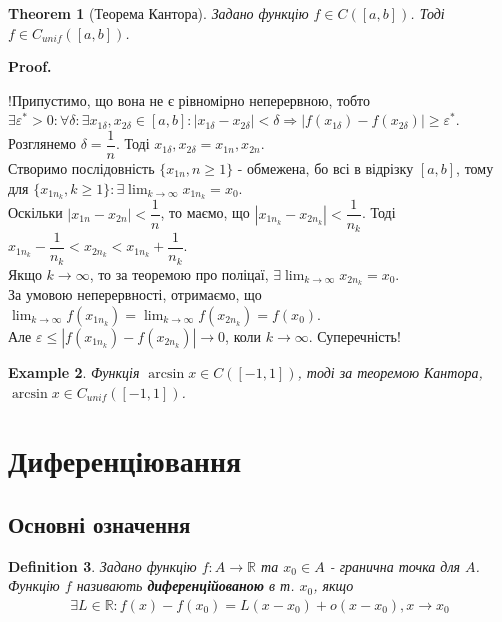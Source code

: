 \documentclass[a4paper, 14pt]{article}
\makeatletter
\def\qed{$\blacksquare$}
\theoremstyle{theoremdd}
\newtheorem{theorem}{Theorem}[subsection]
\theoremstyle{theoremdd}
\newtheorem{definition}[theorem]{Definition}
\theoremstyle{theoremdd}
\theoremstyle{theoremdd}
\newtheorem{example}[theorem]{Example}
\theoremstyle{theoremdd}
\theoremstyle{theoremdd}
\theoremstyle{theoremdd}
\theoremstyle{theoremdd}
\renewenvironment{proof}[1][Proof.\\]{\par
\pushQED{\hfill \qed}%
\normalfont \topsep6\p@\@plus6\p@\relax
\trivlist
\item\relax
{\bfseries
#1\@addpunct{.}}\hspace\labelsep\ignorespaces
}{%
\popQED\endtrivlist\@endpefalse
}
\makeatother
\begin{document}
\begin{theorem}[Теорема Кантора]
Задано функцію $f \in C([a,b])$. Тоді $f \in C_{unif}([a,b])$.
\end{theorem}

\begin{proof}
!Припустимо, що вона не є рівномірно неперервною, тобто\\
$\exists \varepsilon^* > 0: \forall \delta: \exists x_{1 \delta}, x_{2 \delta} \in [a,b]: |x_{1 \delta} - x_{2 \delta}| < \delta \Rightarrow |f(x_{1 \delta}) - f(x_{2 \delta})| \geq \varepsilon^*$.\\
Розглянемо $\delta = \dfrac{1}{n}$. Тоді $x_{1 \delta}, x_{2 \delta} = x_{1n}, x_{2n}$.\\
Створимо послідовність $\{x_{1n}, n \geq 1\}$ - обмежена, бо всі в відрізку $[a,b]$, тому для $\{x_{{1n}_k}, k \geq 1\}: \exists \displaystyle \lim_{k \to \infty} x_{{1n}_k} = x_0$.\\
Оскільки $|x_{1n} - x_{2n}| < \dfrac{1}{n}$, то маємо, що $|x_{1n_k} - x_{2n_k}| < \dfrac{1}{n_k}$. Тоді $x_{1n_k} - \dfrac{1}{n_k} < x_{2n_k} < x_{1n_k} + \dfrac{1}{n_k}$.\\
Якщо $k \to \infty$, то за теоремою про поліцаї, $\exists \displaystyle \lim_{k \to \infty} x_{2n_k} = x_0$.\\
За умовою неперервності, отримаємо, що $\displaystyle\lim_{k \to \infty} f(x_{1n_k}) = \lim_{k \to \infty} f(x_{2n_k}) = f(x_0)$.\\
Але $\varepsilon \leq |f(x_{1n_k}) - f(x_{2n_k})| \to 0$, коли $k \to \infty$. Суперечність!
\end{proof}

\begin{example}
Функція $\arcsin x \in C([-1,1])$, тоді за теоремою Кантора, $\arcsin x \in C_{unif}([-1,1])$.
\end{example}

\newpage


\section{Диференціювання}
\subsection{Основні означення}
\begin{definition}
Задано функцію $f: A \to \mathbb{R}$ та $x_0 \in A$ - гранична точка для $A$.\\
Функцію $f$ називають \textbf{диференційованою} в т. $x_0$, якщо
\begin{align*}
\exists L \in \mathbb{R}: f(x) - f(x_0) = L(x-x_0)+o(x-x_0),x \to x_0
\end{align*}
\end{definition}
\end{document}
